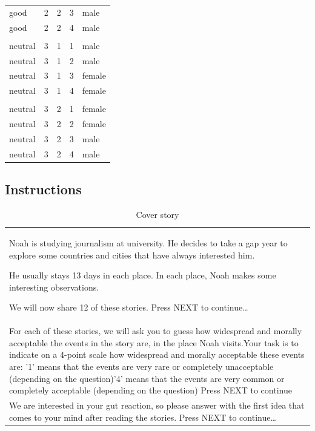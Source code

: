 \documentclass[
]{article}
\begin{document}
\begin{longtable}[t]{lrrrl}
\hspace{1em}good & 2 & 2 & 3 & male\\
\hspace{1em}good & 2 & 2 & 4 & male\\
\addlinespace[0.3em]
\multicolumn{5}{l}{\textbf{Participant Group 5}}\\
\hspace{1em}neutral & 3 & 1 & 1 & male\\
\hspace{1em}neutral & 3 & 1 & 2 & male\\
\hspace{1em}neutral & 3 & 1 & 3 & female\\
\hspace{1em}neutral & 3 & 1 & 4 & female\\
\addlinespace[0.3em]
\multicolumn{5}{l}{\textbf{Participant Group 6}}\\
\hspace{1em}neutral & 3 & 2 & 1 & female\\
\hspace{1em}neutral & 3 & 2 & 2 & female\\
\hspace{1em}neutral & 3 & 2 & 3 & male\\
\hspace{1em}neutral & 3 & 2 & 4 & male\\
\bottomrule
\end{longtable}

\subsection{Instructions}\label{instructions-1}

\begin{longtable}[t]{l}
\caption{\label{tab:print-instructions2}Cover story}\\
\toprule
\\
\midrule
Noah is studying journalism at university. He decides to take a gap year to explore some countries and cities that have always interested him.

He usually stays 13 days in each place. In each place, Noah makes some interesting observations.

We will now share 12 of these stories.
Press NEXT to continue…\\
For each of these stories, we will ask you to guess how widespread and morally acceptable the events in the story are, in the place Noah visits.Your task is to indicate on a 4-point scale how widespread and morally acceptable these events are:
'1' means that the events are very rare or completely unacceptable (depending on the question)'4' means that the events are very common or completely acceptable (depending on the question)
Press NEXT to continue\\
We are interested in your gut reaction, so please answer with the first idea that comes to your mind after reading the stories.
Press NEXT to continue…\\
\bottomrule
\end{longtable}


\end{document}
